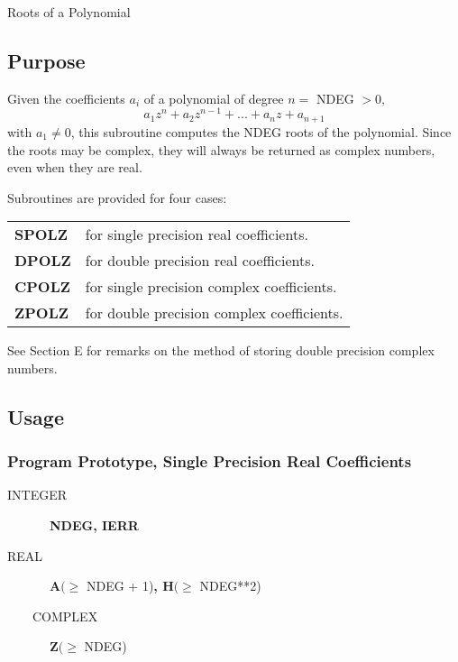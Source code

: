 \documentclass[twoside]{MATH77}
\begin{document}
 Roots of a Polynomial


\subsection{Purpose}

Given the coefficients $a_i$ of a polynomial of degree $n=$ {NDEG }$>0,$%
\begin{equation*}
a_1z^n+a_2z^{n-1}+...+a_nz+a_{n+1}
\end{equation*}
with $a_1\neq 0$, this subroutine computes the NDEG roots of the polynomial.
Since the roots may be complex, they will always be returned as complex
numbers, even when they are real.

Subroutines are provided for four cases:

\begin{tabular}{ll}
{\bf SPOLZ} & for single precision real coefficients.\\
{\bf DPOLZ} & for double precision real coefficients.\\
{\bf CPOLZ} & for single precision complex coefficients.\\
{\bf ZPOLZ} & for double precision complex coefficients.\\
\end{tabular}

See Section E for remarks on the method of storing double precision complex
numbers.

\subsection{Usage}

\subsubsection{Program Prototype, Single Precision Real Coefficients}

\begin{description}
\item[INTEGER]  \ {\bf NDEG, IERR}

\item[REAL]  \ {\bf A}$(\geq $ NDEG + 1){\bf , H}$(\geq $ NDEG**2)

\item[~~~~COMPLEX]  \ {\bf Z}$(\geq $ NDEG)
\end{description}
\end{document}
